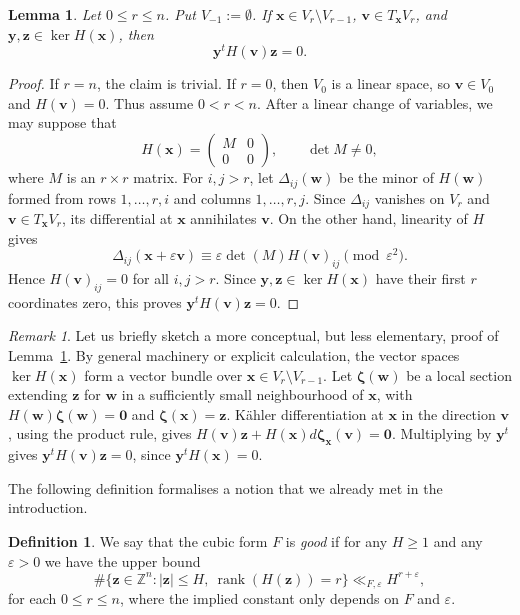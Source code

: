 \documentclass[a4paper,11pt, twoside,reqno]{amsart}
\theoremstyle{plain}
\newtheorem{lemma}[thm]{Lemma}
\theoremstyle{definition}
\newtheorem{defin}[thm]{Definition}
\theoremstyle{remark}
\newtheorem{rem}[thm]{Remark}
\newcommand{\bfv}{\bm{v}}
\newcommand{\bfx}{\bm{x}}
\newcommand{\bfy}{\bm{y}}
\newcommand{\bfz}{\bm{z}}
\DeclareMathOperator{\rank}{rank}
\newcommand{\ve}{\varepsilon}
\renewcommand{\le}{\leqslant}
\renewcommand{\leq}{\leqslant}
\renewcommand{\geq}{\geqslant}
\newcommand{\bfw}{\bm{w}}
\numberwithin{equation}{section}
\begin{document}
\begin{lemma}
\label{LEM:dav-bad-tangent-space}
Let $0\le r\le n$.
Put $V_{-1}:=\emptyset$.
If $\bfx\in V_r \setminus V_{r-1}$,
$\bfv\in T_{\bfx}V_r$,
and $\bfy,\bfz\in\ker H(\bfx)$,
then $$\bfy^tH(\bfv)\bfz=0.$$
\end{lemma}


\begin{proof}
If $r=n$, the claim is trivial. If $r=0$, then $V_0$ is a
linear space, so $\bfv\in V_0$ and $H(\bfv)=0$.
Thus assume $0<r<n$.
After a linear change of variables, we may suppose that
$$
H(\bfx)=
\begin{pmatrix}
M&0\\
0&0
\end{pmatrix},
\qquad \det M\ne0,
$$
where $M$ is an $r\times r$ matrix.
For $i,j>r$, let $\Delta_{ij}(\bfw)$ be the minor of $H(\bfw)$
formed from rows $1,\dots,r,i$ and columns $1,\dots,r,j$.
Since $\Delta_{ij}$ vanishes on $V_r$ and
$\bfv\in T_{\bfx}V_r$, its differential at $\bfx$ annihilates
$\bfv$. On the other hand, linearity of $H$ gives
$$
\Delta_{ij}(\bfx+\ve\bfv)
\equiv \ve\det(M)H(\bfv)_{ij}\pmod{\ve^2}.
$$
Hence $H(\bfv)_{ij}=0$ for all $i,j>r$.
Since $\bfy,\bfz\in\ker H(\bfx)$ have their first $r$
coordinates zero, this proves $\bfy^tH(\bfv)\bfz=0$.
\end{proof}


\begin{rem}
Let us briefly sketch a
more conceptual,
but less elementary,
proof of Lemma~\ref{LEM:dav-bad-tangent-space}.
By general machinery or explicit calculation,
the vector spaces $\ker H(\bfx)$
form a vector bundle over $\bfx\in V_r \setminus V_{r-1}$.
Let $\boldsymbol{\zeta}(\bfw)$ be a local section extending $\bm{z}$ for $\bfw$ in a sufficiently small neighbourhood of $\bfx$, with
$H(\bfw)\boldsymbol{\zeta}(\bfw)=\bm0$
and $\boldsymbol{\zeta}(\bfx)=\bfz$.
K\"{a}hler differentiation at $\bfx$ in the direction $\bfv$,
using the product rule, gives $H(\bfv)\bfz+H(\bfx)d\boldsymbol{\zeta}_{\bfx}(\bfv)=\bm0$.
Multiplying by $\bfy^t$ gives $\bfy^tH(\bfv)\bfz=0$,
since $\bfy^tH(\bfx)=0$.
\end{rem}


The following definition formalises a notion that we already met in the introduction. 

\begin{defin}
\label{defn : good}
We say that the cubic form $F$ is {\em good} if
for any $H \geq 1$ and any $\ve>0$ we have the upper bound   
\[
\#\{\bfz\in\mathbb{Z}^n: |\bfz|\leq H,~ \rank(H(\bfz))=r\}
\ll_{F,\varepsilon} H^{r+\varepsilon},
\]
for each $0\leq r\leq n$,
where the implied constant only depends on $F$ and $\ve$.
\end{defin}
\end{document}
